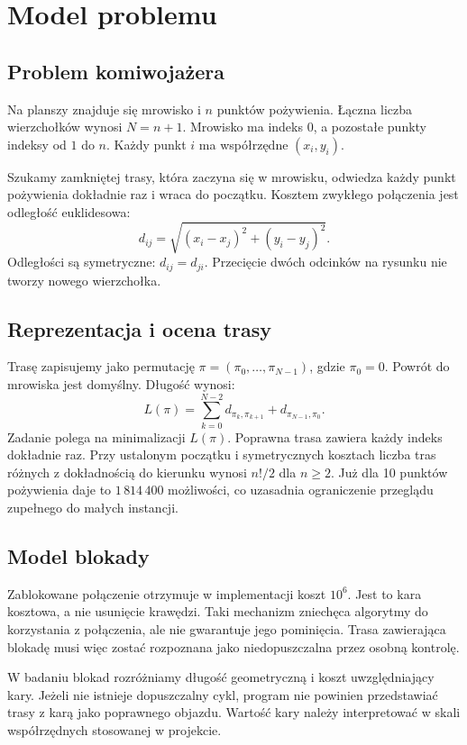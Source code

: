 \documentclass[11pt,a4paper]{article}
\newcommand{\rozdzial}[1]{\clearpage\section{#1}}
\begin{document}
\rozdzial{Model problemu}
\subsection{Problem komiwojażera}
Na planszy znajduje się mrowisko i $n$ punktów pożywienia. Łączna liczba wierzchołków wynosi $N=n+1$. Mrowisko ma indeks $0$, a pozostałe punkty indeksy od $1$ do $n$. Każdy punkt $i$ ma współrzędne $(x_i,y_i)$.

Szukamy zamkniętej trasy, która zaczyna się w mrowisku, odwiedza każdy punkt pożywienia dokładnie raz i wraca do początku. Kosztem zwykłego połączenia jest odległość euklidesowa:
\begin{equation}
d_{ij}=\sqrt{(x_i-x_j)^2+(y_i-y_j)^2}.
\end{equation}
Odległości są symetryczne: $d_{ij}=d_{ji}$. Przecięcie dwóch odcinków na rysunku nie tworzy nowego wierzchołka.

\subsection{Reprezentacja i ocena trasy}
Trasę zapisujemy jako permutację $\pi=(\pi_0,\ldots,\pi_{N-1})$, gdzie $\pi_0=0$. Powrót do mrowiska jest domyślny. Długość wynosi:
\begin{equation}
L(\pi)=\sum_{k=0}^{N-2}d_{\pi_k,\pi_{k+1}}+d_{\pi_{N-1},\pi_0}.
\end{equation}
Zadanie polega na minimalizacji $L(\pi)$. Poprawna trasa zawiera każdy indeks dokładnie raz. Przy ustalonym początku i symetrycznych kosztach liczba tras różnych z dokładnością do kierunku wynosi $n!/2$ dla $n\geq2$. Już dla 10 punktów pożywienia daje to $1\,814\,400$ możliwości, co uzasadnia ograniczenie przeglądu zupełnego do małych instancji.

\subsection{Model blokady}
Zablokowane połączenie otrzymuje w implementacji koszt $10^6$. Jest to kara kosztowa, a nie usunięcie krawędzi. Taki mechanizm zniechęca algorytmy do korzystania z połączenia, ale nie gwarantuje jego pominięcia. Trasa zawierająca blokadę musi więc zostać rozpoznana jako niedopuszczalna przez osobną kontrolę.

W badaniu blokad rozróżniamy długość geometryczną i koszt uwzględniający kary. Jeżeli nie istnieje dopuszczalny cykl, program nie powinien przedstawiać trasy z karą jako poprawnego objazdu. Wartość kary należy interpretować w skali współrzędnych stosowanej w projekcie.
\end{document}
